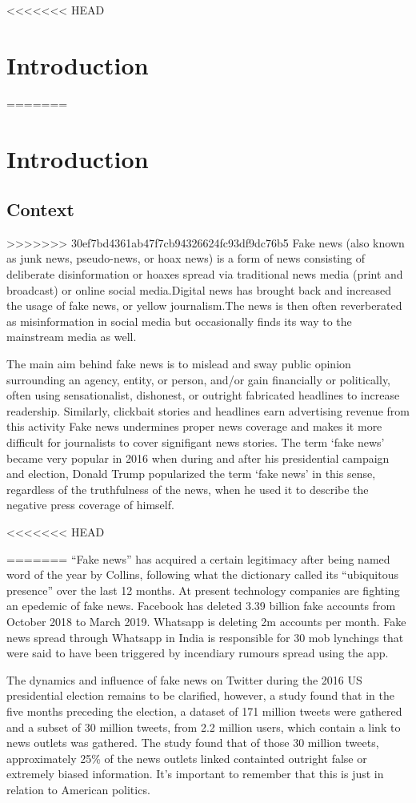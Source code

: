 <<<<<<< HEAD
\chapter{Introduction}

=======
 \chapter{Introduction}
 \section{Context}
>>>>>>> 30ef7bd4361ab47f7cb94326624fc93df9dc76b5
Fake news (also known as junk news, pseudo-news, or hoax news) is a form of news consisting of deliberate disinformation or hoaxes spread via traditional news media
(print and broadcast) or online social media.Digital news has brought back and increased the usage of fake news, or yellow journalism.The news is then often reverberated
as misinformation in social media but occasionally finds its way to the mainstream media as well.

The main aim behind fake news is to mislead and sway public opinion surrounding an agency, entity, or person, and/or gain financially or politically, often using sensationalist,
dishonest, or outright fabricated headlines to increase readership. Similarly, clickbait stories and headlines earn advertising revenue from this activity Fake news undermines proper
news coverage and makes it more difficult for journalists to cover signifigant news stories. The term `fake news' became very popular in 2016 when during and after his presidential
campaign and election, Donald Trump popularized the term `fake news' in this sense, regardless of the truthfulness of the news, when he used it to describe the negative press coverage of himself.

<<<<<<< HEAD

=======
“Fake news” has acquired a certain legitimacy after being named word of the year by Collins, following what the dictionary called its “ubiquitous presence” over the last 12 months. At present technology companies are fighting an epedemic of fake news. Facebook has deleted 3.39 billion fake accounts from October 2018 to March 2019. Whatsapp is deleting 2m accounts per month. Fake news spread through Whatsapp in India is responsible for 30 mob lynchings that were said to have been triggered by incendiary rumours spread using the app. 

The dynamics and influence of fake news on Twitter during the 2016 US presidential election remains to be clarified, however, a study found that in the five months preceding the election, a dataset of 171 million tweets were gathered and a subset of 30 million tweets, from 2.2 million users, which contain a link to news outlets was gathered. The study found that of those 30 million tweets, approximately 25\% of the news outlets linked containted outright false or extremely biased information\cite{bovet2019influence}. It's important to remember that this is just in relation to American politics.

